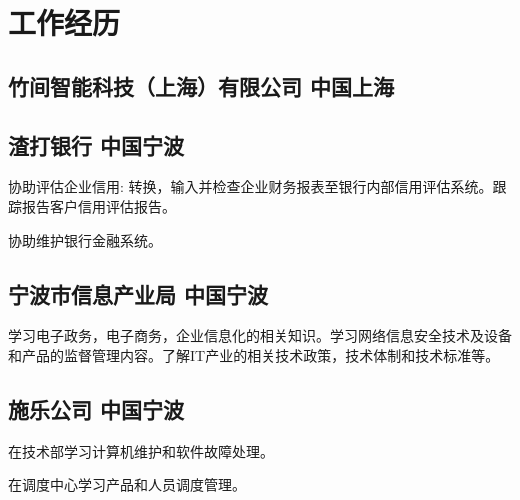 \documentclass[12pt,a4paper]{resume}
\begin{document}
\begin{minipage}[t]{0.63\textwidth} 

\section{工作经历}

\subsection{竹间智能科技（上海）有限公司 \hfill 中国上海}
\subtitle{研发工程师 \hfill 2016年4月 - 至今}
\vspace{12pt}
\begin{lists} 
\end{lists}
\sectionsep

\subsection{渣打银行 \hfill 中国宁波}
\subtitle{信息与网络安全部门实习生 \hfill 2013年10月 - 2014年1月}
\begin{lists}
\item 协助评估企业信用: 转换，输入并检查企业财务报表至银行内部信用评估系统。跟踪报告客户信用评估报告。
\item 协助维护银行金融系统。
\end{lists}
\sectionsep


\subsection{宁波市信息产业局 \hfill 中国宁波}
\subtitle{网络与通信管理处实习生 \hfill 2013年1月 - 2013年2月}
\begin{lists}
\item 学习电子政务，电子商务，企业信息化的相关知识。学习网络信息安全技术及设备和产品的监督管理内容。了解IT产业的相关技术政策，技术体制和技术标准等。
\end{lists}
\sectionsep

\subsection{施乐公司 \hfill 中国宁波}
\subtitle{技术部和调度中心实习生 \hfill 2012年7月 - 2012年8月,}
\begin{lists}
\item 在技术部学习计算机维护和软件故障处理。
\item 在调度中心学习产品和人员调度管理。
\end{lists}
\sectionsep


\end{minipage}
\end{document}
